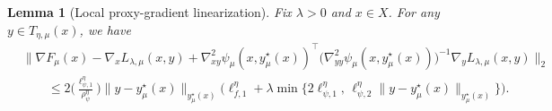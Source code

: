 \documentclass{article}
\newtheorem{lemma}{Lemma}
\begin{document}
\begin{lemma}[Local proxy-gradient linearization]
\label{lem:proxy_direction_linearization}
Fix \(\lambda>0\) and \(x\in X\). For any \(y\in T_{\eta,\mu}(x)\), we have
\begin{align}
&\Big\|
\nabla F_\mu(x)
-\nabla_x L_{\lambda,\mu}(x,y)
+\nabla^2_{xy}\psi_\mu(x,y_\mu^\star(x))^\top
\big(\nabla^2_{yy}\psi_\mu(x,y_\mu^\star(x))\big)^{-1}
\nabla_y L_{\lambda,\mu}(x,y)
\Big\|_2
\nonumber\\
&\qquad\le
2\Big(\frac{\ell_{\psi,1}^\eta}{\rho_\psi^\eta}\Big)
\|y-y_\mu^\star(x)\|_{y_\mu^\star(x)}
\Big(
\ell_{f,1}^\eta
+
\lambda\min\{
2\ell_{\psi,1}^\eta,\,
\ell_{\psi,2}^\eta\|y-y_\mu^\star(x)\|_{y_\mu^\star(x)}
\}
\Big).
\label{eq:proxy_linearization_bound}
\end{align}
\end{lemma}
\end{document}
